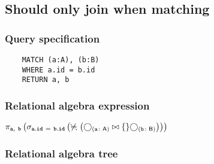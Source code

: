 	\subsection{Should only join when matching}

	\subsubsection*{Query specification}

	\begin{lstlisting}
	MATCH (a:A), (b:B)
	WHERE a.id = b.id
	RETURN a, b
	\end{lstlisting}


	\subsubsection*{Relational algebra expression}

	$\projection{\var{a},~\var{b}} \left(\selection{\mathtt{a.id~=~b.id}} \left(\alldifferent{} \left(\getvertices{a}{A} \join \{\} \getvertices{b}{B}\right)\right)\right)$

	\subsubsection*{Relational algebra tree}


